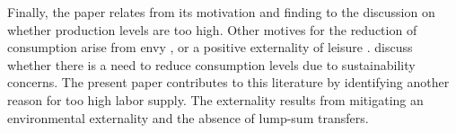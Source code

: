 Finally, the paper relates from its motivation and finding to the discussion on whether production levels are too high. 
Other motives for the reduction of consumption arise from
envy \cite{Alvarez-Cuadrado2007EnvyHours}, or a positive externality of leisure \cite{Alesina2005WorkDifferent}. \cite{Arrow2004AreMuch} discuss whether there is a need to reduce consumption levels due to sustainability concerns. 
 The present paper contributes to this literature by identifying another reason for too high labor supply. The externality results from mitigating an environmental externality and the absence of lump-sum transfers.
